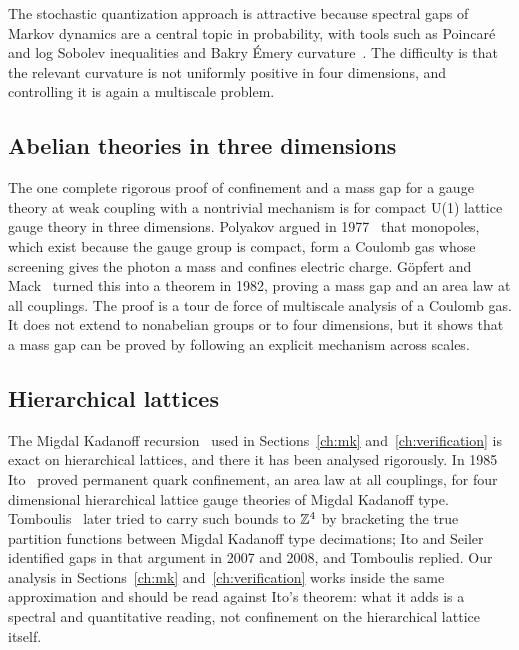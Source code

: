 The stochastic quantization approach is attractive because spectral gaps of Markov dynamics are a central topic in probability, with tools such as Poincar\'e and log Sobolev inequalities and Bakry \'Emery curvature~\cite{BE}. The difficulty is that the relevant curvature is not uniformly positive in four dimensions, and controlling it is again a multiscale problem.

\subsection{Abelian theories in three dimensions}

The one complete rigorous proof of confinement and a mass gap for a gauge theory at weak coupling with a nontrivial mechanism is for compact U(1) lattice gauge theory in three dimensions. Polyakov argued in 1977~\cite{Po77} that monopoles, which exist because the gauge group is compact, form a Coulomb gas whose screening gives the photon a mass and confines electric charge. G\"opfert and Mack~\cite{GM82} turned this into a theorem in 1982, proving a mass gap and an area law at all couplings. The proof is a tour de force of multiscale analysis of a Coulomb gas. It does not extend to nonabelian groups or to four dimensions, but it shows that a mass gap can be proved by following an explicit mechanism across scales.

\subsection{Hierarchical lattices}

The Migdal Kadanoff recursion~\cite{Mi75,Ka76} used in Sections~\ref{ch:mk} and~\ref{ch:verification} is exact on hierarchical lattices, and there it has been analysed rigorously. In 1985 Ito~\cite{Ito85} proved permanent quark confinement, an area law at all couplings, for four dimensional hierarchical lattice gauge theories of Migdal Kadanoff type. Tomboulis~\cite{To07} later tried to carry such bounds to $\mathbb{Z}^4$ by bracketing the true partition functions between Migdal Kadanoff type decimations; Ito and Seiler~\cite{IS} identified gaps in that argument in 2007 and 2008, and Tomboulis replied. Our analysis in Sections~\ref{ch:mk} and~\ref{ch:verification} works inside the same approximation and should be read against Ito's theorem: what it adds is a spectral and quantitative reading, not confinement on the hierarchical lattice itself.

